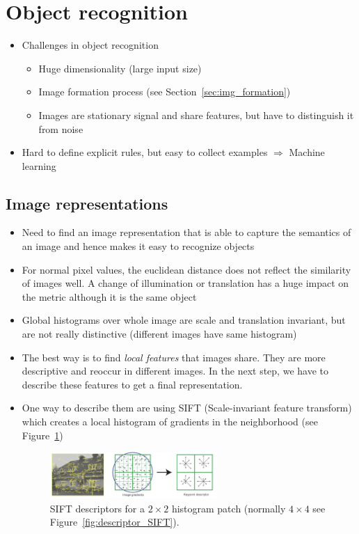 \section{Object recognition}
\begin{itemize}
	\item Challenges in object recognition
	\begin{itemize}
		\item Huge dimensionality (large input size)
		\item Image formation process (see Section~\ref{sec:img_formation})
		\item Images are stationary signal and share features, but have to distinguish it from noise
	\end{itemize}
	\item Hard to define explicit rules, but easy to collect examples $\Rightarrow$ Machine learning
\end{itemize}
\subsection{Image representations}
\begin{itemize}
	\item Need to find an image representation that is able to capture the semantics of an image and hence makes it easy to recognize objects
	\item For normal pixel values, the euclidean distance does not reflect the similarity of images well. A change of illumination or translation has a huge impact on the metric although it is the same object
	\item Global histograms over whole image are scale and translation invariant, but are not really distinctive (different images have same histogram)
	\item The best way is to find \textit{local features} that images share. They are more descriptive and reoccur in different images. In the next step, we have to describe these features to get a final representation. 
	\item One way to describe them are using SIFT (Scale-invariant feature transform) which creates a local histogram of gradients in the neighborhood (see Figure~\ref{fig:SIFT})
	\begin{figure}[ht!]
		\centering
		\includegraphics[width=0.6\textwidth]{figures/cv_object_detection_SIFT.png}
		\caption{SIFT descriptors for a $2\times 2$ histogram patch (normally $4\times 4$ see Figure~\ref{fig:descriptor_SIFT}).}
		\label{fig:SIFT}
	\end{figure}
\end{itemize}
